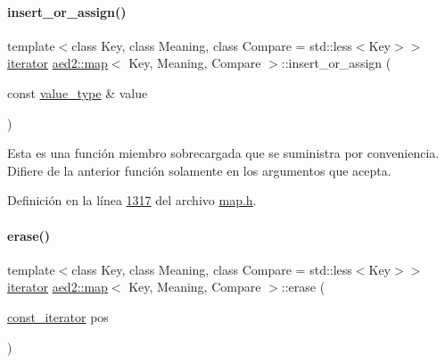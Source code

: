 \paragraph{\texorpdfstring{insert\+\_\+or\+\_\+assign()}{insert\_or\_assign()}\hspace{0.1cm}{\footnotesize\ttfamily [2/2]}}
{\footnotesize\ttfamily template$<$class Key, class Meaning, class Compare = std\+::less$<$\+Key$>$$>$ \\
\hyperlink{classaed2_1_1map_1_1iterator}{iterator} \hyperlink{classaed2_1_1map}{aed2\+::map}$<$ Key, Meaning, Compare $>$\+::insert\+\_\+or\+\_\+assign (\begin{DoxyParamCaption}\item[{const \hyperlink{classaed2_1_1map_a719db98e0ff9a837610f76be33264680_a719db98e0ff9a837610f76be33264680}{value\+\_\+type} \&}]{value }\end{DoxyParamCaption})\hspace{0.3cm}{\ttfamily [inline]}}

Esta es una función miembro sobrecargada que se suministra por conveniencia. Difiere de la anterior función solamente en los argumentos que acepta. 

Definición en la línea \hyperlink{map_8h_source_l01317}{1317} del archivo \hyperlink{map_8h_source}{map.\+h}.

\mbox{\label{classaed2_1_1map_ad8e796bf9c9c558e5ce6b61e116253fe_ad8e796bf9c9c558e5ce6b61e116253fe}} 
\paragraph{\texorpdfstring{erase()}{erase()}\hspace{0.1cm}{\footnotesize\ttfamily [1/2]}}
{\footnotesize\ttfamily template$<$class Key, class Meaning, class Compare = std\+::less$<$\+Key$>$$>$ \\
\hyperlink{classaed2_1_1map_1_1iterator}{iterator} \hyperlink{classaed2_1_1map}{aed2\+::map}$<$ Key, Meaning, Compare $>$\+::erase (\begin{DoxyParamCaption}\item[{\hyperlink{classaed2_1_1map_1_1const__iterator}{const\+\_\+iterator}}]{pos }\end{DoxyParamCaption})\hspace{0.3cm}{\ttfamily [inline]}}




